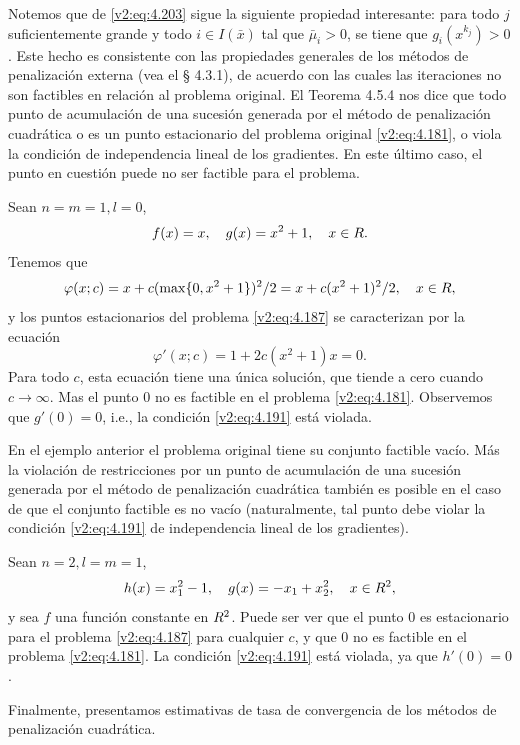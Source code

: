 Notemos que de \eqref{v2:eq:4.203} sigue la siguiente propiedad interesante: para todo $j$ suficientemente grande y todo $i \in I(\bar{x})$ tal que $\bar{\mu}_i > 0$, se tiene que $g_i(x^{k_j}) > 0$. Este hecho es consistente con las propiedades generales de los métodos de penalización externa (vea el § 4.3.1), de acuerdo con las cuales las iteraciones no son factibles en relación al problema original.
El Teorema 4.5.4 nos dice que todo punto de acumulación de una sucesión generada por el método de penalización cuadrática o es un punto estacionario del problema original \eqref{v2:eq:4.181}, o viola la condición de independencia lineal de los gradientes.
En este último caso, el punto en cuestión puede no ser factible para
el problema.

\begin{example}\label{v2:exa:4.5.2}
    Sean $n = m = 1, l = 0$,
    \[
        f(x) = x, \quad g(x) = x^2 + 1, \quad x \in R.
    \]
    Tenemos que
    \[
        \varphi(x; c) = x + c(\max\{0, x^2 + 1\})^2 / 2 = x + c(x^2 + 1)^2 / 2, \quad x \in R,
    \]
    y los puntos estacionarios del problema \eqref{v2:eq:4.187} se caracterizan por la ecuación
    \[
        \varphi'(x; c) = 1 + 2c(x^2 + 1)x = 0.
    \]
    Para todo $c$, esta ecuación tiene una única solución, que tiende a cero cuando $c \to \infty$. Mas el punto $0$ no es factible en el problema \eqref{v2:eq:4.181}. Observemos que $g'(0) = 0$, i.e., la condición \eqref{v2:eq:4.191} está violada.

    En el ejemplo anterior el problema original tiene su conjunto factible vacío. Más la violación de restricciones por un punto de acumulación de una sucesión generada por el método de penalización cuadrática también es posible en el caso de que el conjunto factible es no vacío (naturalmente, tal punto debe violar la condición \eqref{v2:eq:4.191} de independencia lineal de los gradientes).
\end{example}

\begin{example}\label{v2:exa:4.5.3}
    Sean $n = 2, l = m = 1$,
    \[
        h(x) = x_1^2 - 1, \quad g(x) = -x_1 + x_2^2, \quad x \in R^2,
    \]
    y sea $f$ una función constante en $R^2$.
    Puede ser ver que el punto $0$ es estacionario para el problema \eqref{v2:eq:4.187} para cualquier $c$, y que $0$ no es factible en el problema \eqref{v2:eq:4.181}. La condición \eqref{v2:eq:4.191} está violada, ya que $h'(0) = 0$.
\end{example}

Finalmente, presentamos estimativas de tasa de convergencia de los métodos de penalización cuadrática.

